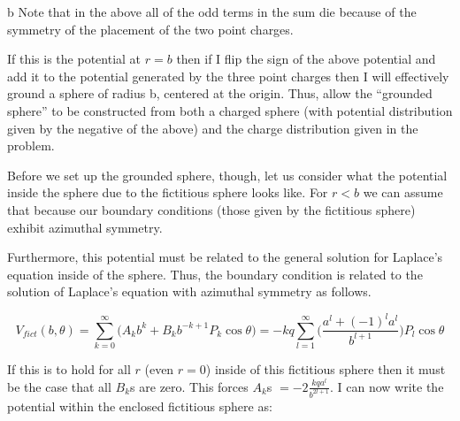 \begin{homeworkProblem}[Jackson 3rd ed. : 3.7]
\begin{homeworkSection}{b}
Note that in the above all of the odd terms in the sum die because of the symmetry of the placement of the two point charges.
\\ \par
If this is the potential at $r = b$ then if I flip the sign of the above potential and add it to the potential generated by the three point charges then I will effectively ground a sphere of radius b, centered at the origin. Thus, allow the ``grounded sphere'' to be constructed from both a charged sphere (with potential distribution given by the negative of the above) and the charge distribution given in the problem.
\\ \par
Before we set up the grounded sphere, though, let us consider what the potential inside the sphere due to the fictitious sphere looks like. For $r<b$ we can assume that because our boundary conditions (those given by the fictitious sphere) exhibit azimuthal symmetry.




Furthermore, this potential must be related to the general solution for Laplace's equation inside of the sphere. Thus, the boundary condition is related to the solution of Laplace's equation with azimuthal symmetry as follows.


\begin{center}
\[
	V_{fict}(b,\theta) = \sum\limits_{k=0}^{\infty}\Big(A_k b^k + B_k b^{-k+1} P_k\cos\theta \Big) = -kq \sum\limits_{l=1}^{\infty}\Big(\frac{a^l+(-1)^l a^l}{b^{l+1}}\Big) P_l\cos\theta
\]
\end{center}

If this is to hold for all $r$ (even $r=0$) inside of this fictitious sphere then it must be the case that all $B_k$s are zero. This forces $A_k$s $=-2\frac{kq a^l}{b^{2l+1}}$. I can now write the potential within the enclosed fictitious sphere as:


\end{homeworkSection}
\end{homeworkProblem}

